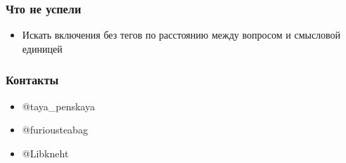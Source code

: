 \documentclass[xcolor=table,xetex,mathserif,serif]{beamer}
\begin{document}
\begin{frame}
	\frametitle{Что не успели}

	\begin{itemize}
		\item Искать включения без тегов по расстоянию между вопросом и смысловой единицей
	\end{itemize}
\end{frame}


\begin{frame}
	\frametitle{Контакты}

	\begin{itemize}
        \item @taya\_penskaya
        \item @furiousteabag
        \item @Libkneht
	\end{itemize}
\end{frame}
\end{document}
